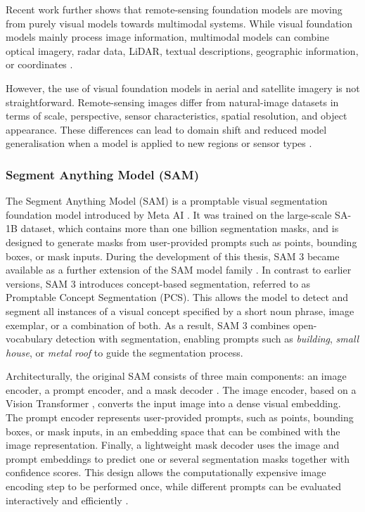 Recent work further shows that remote-sensing foundation models are moving from purely visual models towards multimodal systems. While visual foundation models mainly process image information, multimodal models can combine optical imagery, radar data, LiDAR, textual descriptions, geographic information, or coordinates \citep{huang2025surveyremotesensingfoundation}.

However, the use of visual foundation models in aerial and satellite imagery is not straightforward. Remote-sensing images differ from natural-image datasets in terms of scale, perspective, sensor characteristics, spatial resolution, and object appearance. These differences can lead to domain shift and reduced model generalisation when a model is applied to new regions or sensor types \citep{huang2025surveyremotesensingfoundation}.

\subsubsection{Segment Anything Model (SAM)}

The Segment Anything Model (SAM) is a promptable visual segmentation foundation model introduced by Meta AI \citep{kirillov2023segment}. It was trained on the large-scale SA-1B dataset, which contains more than one billion segmentation masks, and is designed to generate masks from user-provided prompts such as points, bounding boxes, or mask inputs. During the development of this thesis, SAM 3 became available as a further extension of the SAM model family \citep{papersam3}. In contrast to earlier versions, SAM 3 introduces concept-based segmentation, referred to as Promptable Concept Segmentation (PCS). This allows the model to detect and segment all instances of a visual concept specified by a short noun phrase, image exemplar, or a combination of both. As a result, SAM 3 combines open-vocabulary detection with segmentation, enabling prompts such as \textit{building}, \textit{small house}, or \textit{metal roof} to guide the segmentation process.

Architecturally, the original SAM consists of three main components: an image encoder, a prompt encoder, and a mask decoder \citep{kirillov2023segment}. The image encoder, based on a Vision Transformer \citep{DosovitskiyTransformer}, converts the input image into a dense visual embedding. The prompt encoder represents user-provided prompts, such as points, bounding boxes, or mask inputs, in an embedding space that can be combined with the image representation. Finally, a lightweight mask decoder uses the image and prompt embeddings to predict one or several segmentation masks together with confidence scores. This design allows the computationally expensive image encoding step to be performed once, while different prompts can be evaluated interactively and efficiently \citep{kirillov2023segment}.

